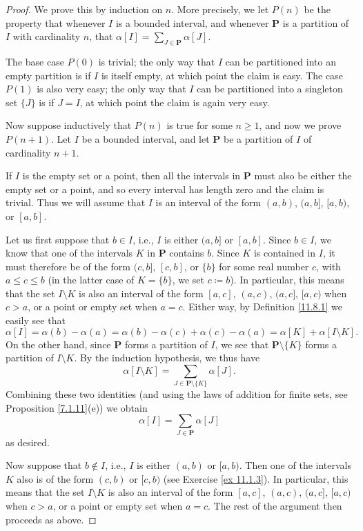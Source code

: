 \begin{proof}
    We prove this by induction on \(n\).
    More precisely, we let \(P(n)\) be the property that whenever \(I\) is a bounded interval, and whenever \(\mathbf{P}\) is a partition of \(I\) with cardinality \(n\), that \(\alpha[I] = \sum_{J \in \mathbf{P}} \alpha[J]\).

    The base case \(P(0)\) is trivial;
    the only way that \(I\) can be partitioned into an empty partition is if \(I\) is itself empty, at which point the claim is easy.
    The case \(P(1)\) is also very easy;
    the only way that \(I\) can be partitioned into a singleton set \(\{J\}\) is if \(J = I\), at which point the claim is again very easy.

    Now suppose inductively that \(P(n)\) is true for some \(n \geq 1\), and now we prove \(P(n + 1)\).
    Let \(I\) be a bounded interval, and let \(\mathbf{P}\) be a partition of \(I\) of cardinality \(n + 1\).

    If \(I\) is the empty set or a point, then all the intervals in \(\mathbf{P}\) must also be either the empty set or a point, and so every interval has length zero and the claim is trivial.
    Thus we will assume that \(I\) is an interval of the form \((a, b)\), \((a, b]\), \([a, b)\), or \([a, b]\).

            Let us first suppose that \(b \in I\), i.e., \(I\) is either \((a, b]\) or \([a, b]\).
    Since \(b \in I\), we know that one of the intervals \(K\) in \(\mathbf{P}\) contains \(b\).
    Since \(K\) is contained in \(I\), it must therefore be of the form \((c, b]\), \([c, b]\), or \(\{b\}\) for some real number \(c\), with \(a \leq c \leq b\) (in the latter case of \(K = \{b\}\), we set \(c \coloneqq b\)).
    In particular, this means that the set \(I \setminus K\) is also an interval of the form \([a, c]\), \((a, c)\), \((a, c]\), \([a, c)\) when \(c > a\), or a point or empty set when \(a = c\).
    Either way, by Definition \ref{11.8.1} we easily see that
    \[
        \alpha[I] = \alpha(b) - \alpha(a) = \alpha(b) - \alpha(c) + \alpha(c) - \alpha(a) = \alpha[K] + \alpha[I \setminus K].
    \]
    On the other hand, since \(\mathbf{P}\) forms a partition of \(I\), we see that \(\mathbf{P} \setminus \{K\}\) forms a partition of \(I \setminus K\).
    By the induction hypothesis, we thus have
    \[
        \alpha[I \setminus K] = \sum_{J \in \mathbf{P} \setminus \{K\}} \alpha[J].
    \]
    Combining these two identities (and using the laws of addition for finite sets, see Proposition \ref{7.1.11}(e)) we obtain
    \[
        \alpha[I] = \sum_{J \in \mathbf{P}} \alpha[J]
    \]
    as desired.

    Now suppose that \(b \notin I\), i.e., \(I\) is either \((a, b)\) or \([a, b)\).
    Then one of the intervals \(K\) also is of the form \((c, b)\) or \([c, b)\) (see Exercise \ref{ex 11.1.3}).
            In particular, this means that the set \(I \setminus K\) is also an interval of the form \([a, c]\), \((a, c)\), \((a, c]\), \([a, c)\) when \(c > a\), or a point or empty set when \(a = c\).
    The rest of the argument then proceeds as above.
\end{proof}